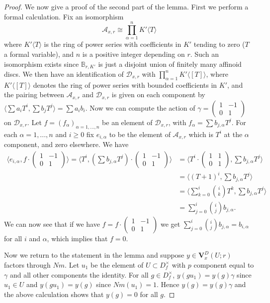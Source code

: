 \documentclass[a4paper, notitlepage]{amsart}
\newcommand{\OCdS}{\ensuremath{\mathbf{V}^D_{x}(U;r)}\xspace}
\begin{document}
\begin{proof}
We now give a proof of the second part of the lemma. First we perform a formal calculation. Fix an isomorphism $$\mathscr{A}_{x,r}\cong\prod_{\alpha=1}^{n}K'\langle T \rangle$$ where $K'\langle T\rangle$ is the ring of power series with coefficients in $K'$ tending to zero ($T$ a formal variable), and $n$ is a positive integer depending on $r$. Such an isomorphism exists since $\mathbb{B}_{r,K'}$ is just a disjoint union of finitely many affinoid discs. We then have an identification of $\mathscr{D}_{x,r}$ with $\prod_{\alpha=1}^{n}K'\langle[T]\rangle$, where $K'\langle[T]\rangle$ denotes the ring of power series with bounded coefficients in $K'$, and the pairing between $\mathscr{A}_{x,r}$ and $\mathscr{D}_{x,r}$ is given on each component by $\langle \sum a_i T^i, \sum b_j T^j\rangle = \sum a_i b_i$. Now we can compute the action of $\gamma=\begin{pmatrix}
1 & -1\\0 & 1
\end{pmatrix}$ on $\mathscr{D}_{x,r}$. Let $f=(f_\alpha)_{\alpha= 1,...,n}$ be an element of $\mathscr{D}_{x,r}$, with $f_\alpha = \sum b_{j,\alpha} T^j.$ For each $\alpha=1,...,n$ and $i\geq 0$ fix $e_{i,\alpha}$ to be the element of $\mathscr{A}_{x,r}$ which is $T^i$ at the $\alpha$ component, and zero elsewhere. We have \begin{align*}\langle e_{i,\alpha},f\cdot\begin{pmatrix}
1 & -1\\0 & 1
\end{pmatrix}\rangle = \langle T^i, (\sum b_{j,\alpha} T^j)\cdot\begin{pmatrix}
1 & -1\\0 & 1
\end{pmatrix}\rangle &=\langle T^i\cdot\begin{pmatrix}
1 & 1\\0 & 1\end{pmatrix}, \sum b_{j,\alpha} T^j \rangle\\
&= \langle (T+1)^i, \sum b_{j,\alpha} T^j \rangle\\ &= \langle \sum_{k=0}^i \binom{i}{k}T^k,\sum b_{j,\alpha} T^j\rangle \\
&= \sum_{j=0}^i \binom{i}{j}b_{j,\alpha}.\end{align*} 
We can now see that if we have $f=f\cdot \begin{pmatrix}
1 & -1\\0 & 1\end{pmatrix}$ we get $\sum_{j=0}^i \binom{i}{j}b_{j,\alpha}=b_{i,\alpha}$ for all $i$ and $\alpha$, which implies that $f=0$. 

Now we return to the statement in the lemma and suppose $y\in \OCdS$ factors through $Nm$. Let $u_1$ be the element of $U \subset D_f^\times$ with $p$ component equal to $\gamma$ and all other components the identity. For all $g \in D_f^\times$, $y(gu_1)=y(g)\gamma$ since $u_1 \in U$ and $y(gu_1)=y(g)$ since $Nm(u_1)=1$. Hence $y(g)=y(g)\gamma$ and the above calculation shows that $y(g)=0$ for all $g$.

\end{proof}
\end{document}
